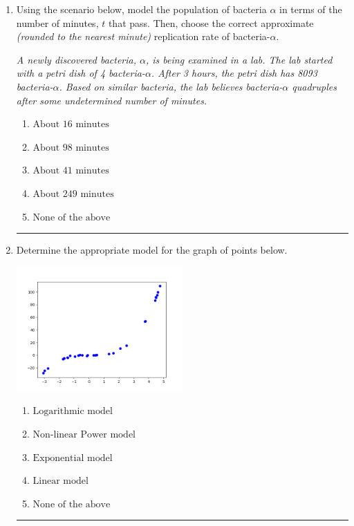 \documentclass[14pt]{extbook}
\newcommand{\litem}[1]{\item#1\hspace*{-1cm}\rule{\textwidth}{0.4pt}}
\begin{document}
\begin{enumerate}
{\begin{enumerate}[label=\Alph*.]
\end{enumerate} }
\litem{
Using the scenario below, model the population of bacteria $\alpha$ in terms of the number of minutes, $t$ that pass. Then, choose the correct approximate \textit{(rounded to the nearest minute)} replication rate of bacteria-$\alpha$.
\begin{center}
    \textit{ A newly discovered bacteria, $\alpha$, is being examined in a lab. The lab started with a petri dish of 4 bacteria-$\alpha$. After 3 hours, the petri dish has 8093 bacteria-$\alpha$. Based on similar bacteria, the lab believes bacteria-$\alpha$ quadruples after some undetermined number of minutes. }
\end{center}
\begin{enumerate}[label=\Alph*.]
\item \( \text{About } 16 \text{ minutes} \)
\item \( \text{About } 98 \text{ minutes} \)
\item \( \text{About } 41 \text{ minutes} \)
\item \( \text{About } 249 \text{ minutes} \)
\item \( \text{None of the above} \)

\end{enumerate} }
\litem{
Determine the appropriate model for the graph of points below.
\begin{center}
    \includegraphics[width=0.5\textwidth]{../Figures/identifyModelGraph11A.png}
\end{center}
\begin{enumerate}[label=\Alph*.]
\item \( \text{Logarithmic model} \)
\item \( \text{Non-linear Power model} \)
\item \( \text{Exponential model} \)
\item \( \text{Linear model} \)
\item \( \text{None of the above} \)


\end{enumerate}}
\end{enumerate}
\end{document}
